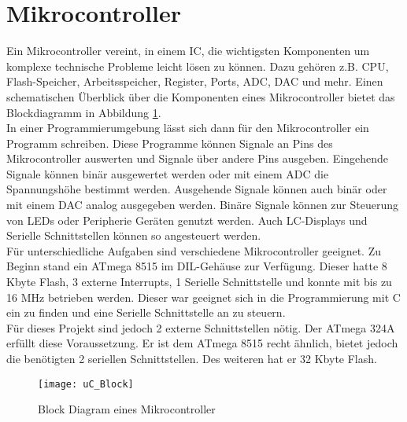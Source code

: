 \section{Mikrocontroller}
Ein Mikrocontroller vereint, in einem IC, die wichtigsten Komponenten um komplexe technische Probleme leicht lösen zu können. Dazu gehören z.B. CPU, Flash-Speicher, Arbeitsspeicher, Register, Ports, ADC, DAC und mehr. Einen schematischen Überblick über die Komponenten eines Mikrocontroller bietet das Blockdiagramm in Abbildung \ref{fig:uC Blockdiagramm}. \\
In einer Programmierumgebung lässt sich dann für den Mikrocontroller ein Programm schreiben. Diese Programme können  Signale an Pins des Mikrocontroller auswerten und Signale über andere Pins ausgeben. Eingehende Signale können binär ausgewertet werden oder mit einem ADC die Spannungshöhe bestimmt werden. Ausgehende Signale können auch binär oder mit einem DAC analog ausgegeben werden. Binäre Signale können zur Steuerung von LEDs oder Peripherie Geräten genutzt werden. Auch LC-Displays und Serielle Schnittstellen können so angesteuert werden.\\
Für unterschiedliche Aufgaben sind verschiedene Mikrocontroller geeignet. Zu Beginn stand ein ATmega 8515\cite{atmel:8515} im DIL-Gehäuse zur Verfügung. Dieser hatte 8 Kbyte Flash, 3 externe Interrupts, 1 Serielle Schnittstelle und konnte mit bis zu 16 MHz betrieben werden. 
Dieser war geeignet sich in die Programmierung mit C ein zu finden und eine Serielle Schnittstelle an zu steuern. \\
Für dieses Projekt sind jedoch 2 externe Schnittstellen nötig. Der ATmega 324A erfüllt diese Voraussetzung. \cite{atmel:324A} Er ist dem ATmega 8515 recht ähnlich, bietet jedoch die benötigten 2 seriellen Schnittstellen. Des weiteren hat er 32 Kbyte Flash. 

\begin{figure}[htb]
\centering
\texttt{[image: uC\_Block]}
\caption{Block Diagram eines Mikrocontroller}
\label{fig:uC Blockdiagramm}
\citep{atmel:ug_324A}
\end{figure}

